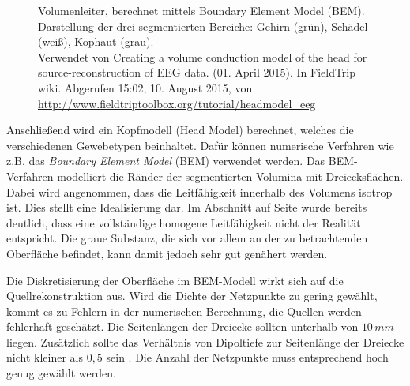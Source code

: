 \documentclass[doc,a4paper,12pt]{apa6}
\makeatletter
\DeclareRobustCommand*{\nameref}[1]{%
      \glqq{\myorg@nameref{#1}}\grqq%
    }%
\makeatother
\begin{document}
\begin{figure}[t]
  \centering
  \vspace*{3mm}
  \caption[Volumenleiter, berechnet mittels Boundary Element Model (BEM)]{Volumenleiter, berechnet mittels Boundary Element Model (BEM). Darstellung der drei segmentierten Bereiche: Gehirn (grün), Schädel (weiß), Kophaut (grau).\\ Verwendet von \glqq Creating a volume conduction model of the head for source-reconstruction of EEG data\grqq . (01. April 2015). In FieldTrip wiki. Abgerufen 15:02, 10. August 2015, von \url{http://www.fieldtriptoolbox.org/tutorial/headmodel_eeg}}
  \label{img:bem}
\end{figure}

Anschließend wird ein Kopfmodell (Head Model) berechnet, welches die verschiedenen Gewebetypen beinhaltet. Dafür können numerische Verfahren wie z.B. das \emph{Boundary Element Model} (BEM) verwendet werden. Das BEM-Verfahren modelliert die Ränder der segmentierten Volumina mit Dreiecksflächen. Dabei wird angenommen, dass die Leitfähigkeit innerhalb des Volumens isotrop ist. Dies stellt eine Idealisierung dar. Im Abschnitt \nameref{sec:head-struct} auf Seite \pageref{sec:head-struct} wurde bereits deutlich, dass eine vollständige homogene Leitfähigkeit nicht der Realität entspricht. Die graue Substanz, die sich vor allem an der zu betrachtenden Oberfläche befindet, kann damit jedoch sehr gut genähert werden.

Die Diskretisierung der Oberfläche im BEM-Modell wirkt sich auf die Quellrekonstruktion aus. Wird die Dichte der Netzpunkte zu gering gewählt, kommt es zu Fehlern in der numerischen Berechnung, die Quellen werden fehlerhaft geschätzt. Die Seitenlängen der Dreiecke sollten unterhalb von $10\,mm$ liegen. Zusätzlich sollte das Verhältnis von Dipoltiefe zur Seitenlänge der Dreiecke nicht kleiner als $0,5$ sein \parencite{haueisen1997effect}. Die Anzahl der Netzpunkte muss entsprechend hoch genug gewählt werden.
\end{document}
